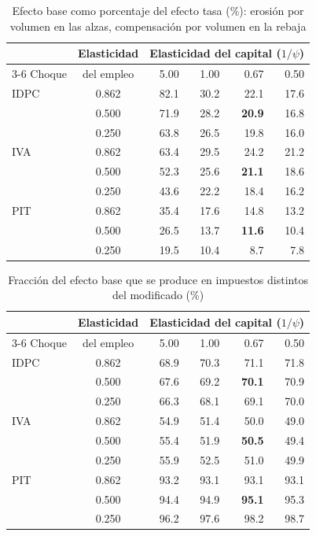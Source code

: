 \documentclass[11pt]{article}
\begin{document}
\begin{table}[H]
\centering
\caption{Efecto base como porcentaje del efecto tasa (\%): erosión por volumen en las alzas, compensación por volumen en la rebaja}
\label{tab:sens-base}
\small
\begin{tabular}{|l|c|r|r|r|r|}
  \hline
  & Elasticidad & \multicolumn{4}{c|}{Elasticidad del capital ($1/\psi$)} \\
  \cline{3-6}
  Choque & del empleo & 5.00 & 1.00 & 0.67 & 0.50 \\
  \hline
  IDPC & 0.862 & 82.1 & 30.2 & 22.1 & 17.6 \\
  & 0.500 & 71.9 & 28.2 & \textbf{20.9} & 16.8 \\
  & 0.250 & 63.8 & 26.5 & 19.8 & 16.0 \\
  \hline
  IVA & 0.862 & 63.4 & 29.5 & 24.2 & 21.2 \\
  & 0.500 & 52.3 & 25.6 & \textbf{21.1} & 18.6 \\
  & 0.250 & 43.6 & 22.2 & 18.4 & 16.2 \\
  \hline
  PIT & 0.862 & 35.4 & 17.6 & 14.8 & 13.2 \\
  & 0.500 & 26.5 & 13.7 & \textbf{11.6} & 10.4 \\
  & 0.250 & 19.5 & 10.4 & 8.7 & 7.8 \\
  \hline
\end{tabular}
\end{table}

\begin{table}[H]
\centering
\caption{Fracción del efecto base que se produce en impuestos distintos del modificado (\%)}
\label{tab:sens-otros}
\small
\begin{tabular}{|l|c|r|r|r|r|}
  \hline
  & Elasticidad & \multicolumn{4}{c|}{Elasticidad del capital ($1/\psi$)} \\
  \cline{3-6}
  Choque & del empleo & 5.00 & 1.00 & 0.67 & 0.50 \\
  \hline
  IDPC & 0.862 & 68.9 & 70.3 & 71.1 & 71.8 \\
  & 0.500 & 67.6 & 69.2 & \textbf{70.1} & 70.9 \\
  & 0.250 & 66.3 & 68.1 & 69.1 & 70.0 \\
  \hline
  IVA & 0.862 & 54.9 & 51.4 & 50.0 & 49.0 \\
  & 0.500 & 55.4 & 51.9 & \textbf{50.5} & 49.4 \\
  & 0.250 & 55.9 & 52.5 & 51.0 & 49.9 \\
  \hline
  PIT & 0.862 & 93.2 & 93.1 & 93.1 & 93.1 \\
  & 0.500 & 94.4 & 94.9 & \textbf{95.1} & 95.3 \\
  & 0.250 & 96.2 & 97.6 & 98.2 & 98.7 \\
  \hline
\end{tabular}
\end{table}
\end{document}
